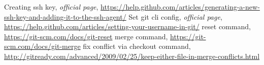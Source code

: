\begin{thebibliography}{99999}
\singlespace\normalsize

 Creating ssh key, \textit{ official page}, \url{https://help.github.com/articles/generating-a-new-ssh-key-and-adding-it-to-the-ssh-agent/}
 Set git cli config, \textit{ official page}, \url{https://help.github.com/articles/setting-your-username-in-git/}
 reset command,  \url{https://git-scm.com/docs/git-reset}
 merge command,  \url{https://git-scm.com/docs/git-merge}
 fix conflict via checkout command,  \url{http://gitready.com/advanced/2009/02/25/keep-either-file-in-merge-conflicts.html}

\end{thebibliography}
